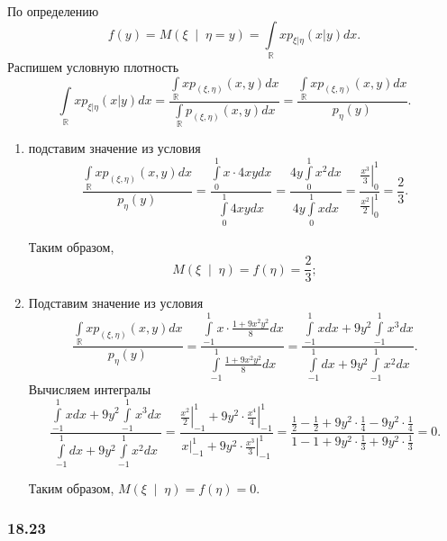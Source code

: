 По определению
$$f \left( y \right) =
  M \left( \xi \; \middle| \; \eta = y \right) =
  \int \limits_{ \mathbb{R}}
    xp_{ \left. \xi \right| \eta } \left( \left. x \right| y \right) dx.$$
Распишем условную плотность
$$ \int \limits_{ \mathbb{R}}
    xp_{ \left. \xi \right| \eta } \left( \left. x \right| y \right) dx =
  \frac{ \int \limits_{ \mathbb{R}} xp_{ \left( \xi, \eta \right) } \left( x, y \right) dx}{ \int \limits_{ \mathbb{R}} p_{ \left( \xi, \eta \right) } \left( x, y \right) dx} =
  \frac{ \int \limits_{ \mathbb{R}} xp_{ \left( \xi, \eta \right) } \left( x, y \right) dx}{p_{ \eta } \left( y \right)}.$$
\begin{enumerate}[label=\alph*)]
  \item подставим значение из условия
  $$ \frac{ \int \limits_{ \mathbb{R}} xp_{ \left( \xi, \eta \right) } \left( x, y \right) dx}{p_{ \eta } \left( y \right)} =
    \frac{ \int \limits_0^1 x \cdot 4xy dx}{ \int \limits_0^1 4xydx} =
    \frac{4y \int \limits_0^1 x^2 dx}{4y \int \limits_0^1 xdx} =
    \frac{ \left. \frac{x^3}{3} \right|_0^1}{ \left. \frac{x^2}{2} \right|_0^1} =
    \frac{2}{3}.$$

  Таким образом,
  $$M \left( \xi \; \middle| \; \eta \right) =
    f \left( \eta \right) =
    \frac{2}{3};$$
  \item Подставим значение из условия
  $$\frac{ \int \limits_{ \mathbb{R}} xp_{ \left( \xi, \eta \right) } \left( x, y \right) dx}{p_{ \eta } \left( y \right)} =
    \frac{ \int \limits_{-1}^1 x \cdot \frac{1 + 9x^2 y^2}{8} dx}{ \int \limits_{-1}^1 \frac{1 + 9x^2 y^2}{8} dx} =
    \frac{ \int \limits_{-1}^1 xdx + 9y^2 \int \limits_{-1}^1 x^3 dx}{ \int \limits_{-1}^1 dx + 9y^2 \int \limits_{-1}^1 x^2 dx}.$$
  Вычисляем интегралы
  $$ \frac{ \int \limits_{-1}^1 xdx + 9y^2 \int \limits_{-1}^1 x^3 dx}{ \int \limits_{-1}^1 dx + 9y^2 \int \limits_{-1}^1 x^2 dx} =
    \frac{ \left. \frac{x^2}{2} \right|_{-1}^1 + 9y^2 \cdot \left. \frac{x^4}{4} \right|_{-1}^1}{ \left. x \right|_{-1}^1 + 9y^2 \cdot \left. \frac{x^3}{3} \right|_{-1}^1} =
    \frac{ \frac{1}{2} - \frac{1}{2} + 9y^2 \cdot \frac{1}{4} - 9y^2 \cdot \frac{1}{4}}{1 - 1 + 9y^2 \cdot \frac{1}{3} + 9y^2 \cdot \frac{1}{3}} =
    0.$$

  Таким образом, $M \left( \xi \; \middle| \; \eta \right) = f \left( \eta \right) = 0$.
\end{enumerate}

\subsubsection*{18.23}

